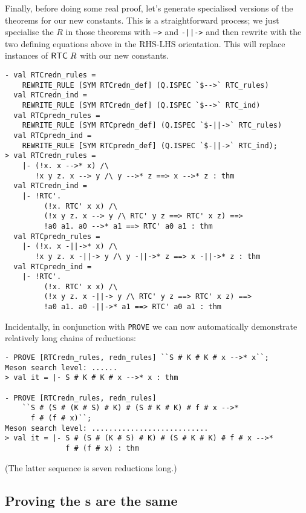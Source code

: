 Finally, before doing some real proof, let's generate specialised
versions of the  theorems for our new constants.  This is a
straightforward process; we just specialise the $R$ in those theorems
with \texttt{-->} and \texttt{-||->} and then rewrite with the two
defining equations above in the RHS-LHS orientation.  This will
replace instances of ${\sf RTC}\;R$ with our new constants.
\begin{session}
\begin{verbatim}
- val RTCredn_rules =
    REWRITE_RULE [SYM RTCredn_def] (Q.ISPEC `$-->` RTC_rules)
  val RTCredn_ind =
    REWRITE_RULE [SYM RTCredn_def] (Q.ISPEC `$-->` RTC_ind)
  val RTCpredn_rules =
    REWRITE_RULE [SYM RTCpredn_def] (Q.ISPEC `$-||->` RTC_rules)
  val RTCpredn_ind =
    REWRITE_RULE [SYM RTCpredn_def] (Q.ISPEC `$-||->` RTC_ind);
> val RTCredn_rules =
    |- (!x. x -->* x) /\
       !x y z. x --> y /\ y -->* z ==> x -->* z : thm
  val RTCredn_ind =
    |- !RTC'.
         (!x. RTC' x x) /\
         (!x y z. x --> y /\ RTC' y z ==> RTC' x z) ==>
         !a0 a1. a0 -->* a1 ==> RTC' a0 a1 : thm
  val RTCpredn_rules =
    |- (!x. x -||->* x) /\
       !x y z. x -||-> y /\ y -||->* z ==> x -||->* z : thm
  val RTCpredn_ind =
    |- !RTC'.
         (!x. RTC' x x) /\
         (!x y z. x -||-> y /\ RTC' y z ==> RTC' x z) ==>
         !a0 a1. a0 -||->* a1 ==> RTC' a0 a1 : thm
\end{verbatim}
\end{session}
Incidentally, in conjunction with \texttt{PROVE} we can now
automatically demonstrate relatively long chains of reductions:
\begin{session}
\begin{verbatim}
- PROVE [RTCredn_rules, redn_rules] ``S # K # K # x -->* x``;
Meson search level: ......
> val it = |- S # K # K # x -->* x : thm

- PROVE [RTCredn_rules, redn_rules]
    ``S # (S # (K # S) # K) # (S # K # K) # f # x -->*
      f # (f # x)``;
Meson search level: ...........................
> val it = |- S # (S # (K # S) # K) # (S # K # K) # f # x -->*
              f # (f # x) : thm
\end{verbatim}
\end{session}
(The latter sequence is seven reductions long.)


\subsection{Proving the s are the same}
\label{sec:Proving-RTCs-same}

